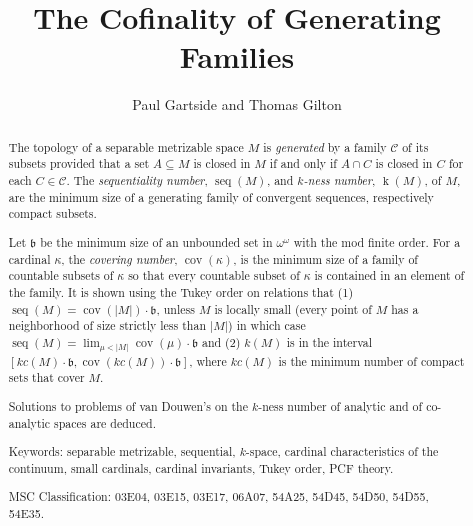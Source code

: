 \documentclass{article}
\title{The Cofinality of Generating Families}
\author{Paul Gartside and Thomas Gilton}
\begin{document}
\maketitle
\begin{abstract}
The topology of a separable metrizable space $M$ is \emph{generated} by a family $\mathcal{C}$ of its subsets provided that a set $A\subseteq M$ is closed in $M$ if and only if $A\cap C$ is closed in $C$ for each $C\in \mathcal{C}$. The \emph{sequentiality number}, $\mathop{seq}(M)$, and \emph{$k$-ness number}, $\mathop{k}(M)$,   of $M$, are the minimum size of a generating family of convergent sequences, respectively compact subsets. 

Let $\mathfrak{b}$ be the minimum size of an unbounded set in $\omega^\omega$ with the mod finite order. For a cardinal $\kappa$, the \emph{covering number}, $\mathop{cov}(\kappa)$, is the minimum size of a family of countable subsets of $\kappa$ so that every countable subset of $\kappa$ is contained in an element of the family. It is shown using the Tukey order on relations that (1) $\mathop{seq}(M)=\mathop{cov}(|M|)\cdot \mathfrak{b}$,  unless $M$ is locally small (every point of $M$ has a neighborhood of size strictly less than $|M|$) in which case $\mathop{seq}(M)=\lim_{\mu <|M|} \mathop{cov}(\mu)\cdot \mathfrak{b}$ and 
(2) $k(M)$ is in the interval $[kc(M)\cdot\mathfrak{b},\mathop{cov}(kc(M))\cdot \mathfrak{b}]$, where $kc(M)$ is the minimum number of compact sets that cover $M$. 

Solutions to problems of van Douwen's on the $k$-ness number of analytic and of co-analytic spaces are deduced. 

\smallskip
Keywords: separable metrizable, sequential, $k$-space, cardinal characteristics of the continuum, small cardinals, cardinal invariants,  Tukey order, \textsc{PCF} theory. 

MSC Classification: 03E04, 03E15, 03E17, 06A07, 54A25, 54D45, 54D50,  54D55, 54E35. 
\end{abstract}
\end{document}
